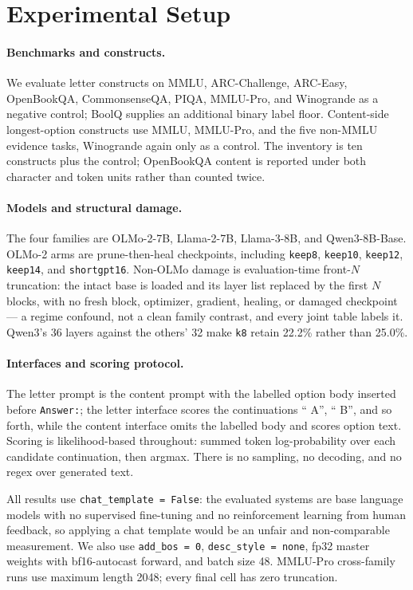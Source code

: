 \section{Experimental Setup}
\label{sec:setup}

\paragraph{Benchmarks and constructs.}
We evaluate letter constructs on MMLU, ARC-Challenge, ARC-Easy, OpenBookQA, CommonsenseQA, PIQA, MMLU-Pro, and Winogrande as a negative control; BoolQ supplies an additional binary label floor. Content-side longest-option constructs use MMLU, MMLU-Pro, and the five non-MMLU evidence tasks, Winogrande again only as a control. The inventory is ten constructs plus the control; OpenBookQA content is reported under both character and token units rather than counted twice.

\paragraph{Models and structural damage.}
The four families are OLMo-2-7B, Llama-2-7B, Llama-3-8B, and Qwen3-8B-Base. OLMo-2 arms are prune-then-heal checkpoints, including \texttt{keep8}, \texttt{keep10}, \texttt{keep12}, \texttt{keep14}, and \texttt{shortgpt16}. Non-OLMo damage is evaluation-time front-$N$ truncation: the intact base is loaded and its layer list replaced by the first $N$ blocks, with no fresh block, optimizer, gradient, healing, or damaged checkpoint --- a regime confound, not a clean family contrast, and every joint table labels it. Qwen3's 36 layers against the others' 32 make \texttt{k8} retain 22.2\% rather than 25.0\%.

\paragraph{Interfaces and scoring protocol.}
The letter prompt is the content prompt with the labelled option body inserted before \texttt{Answer:}; the letter interface scores the continuations `` A'', `` B'', and so forth, while the content interface omits the labelled body and scores option text. Scoring is likelihood-based throughout: summed token log-probability over each candidate continuation, then argmax. There is no sampling, no decoding, and no regex over generated text.

All results use \texttt{chat\_template = False}: the evaluated systems are base language models with no supervised fine-tuning and no reinforcement learning from human feedback, so applying a chat template would be an unfair and non-comparable measurement. We also use \texttt{add\_bos = 0}, \texttt{desc\_style = none}, fp32 master weights with bf16-autocast forward, and batch size 48. MMLU-Pro cross-family runs use maximum length 2048; every final cell has zero truncation.

